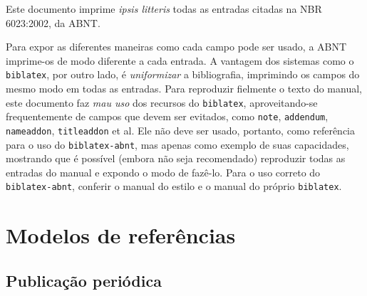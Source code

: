 \documentclass[a4paper]{article}
\title{NBR 6023:2002 - \iftoggle{reference}{Referência}{Teste}}
\author{Daniel Ballester Marques}
\let\origsection\section
\renewcommand\section{\clearpage\origsection}
\begin{document}
\maketitle

Este documento imprime \textit{ipsis litteris} todas as entradas citadas na
NBR 6023:2002, da ABNT.

Para expor as diferentes maneiras como cada campo pode ser usado, a ABNT
imprime-os de modo diferente a cada entrada. A vantagem dos sistemas como
o \texttt{biblatex}, por outro lado, é \emph{uniformizar} a bibliografia,
imprimindo os campos do mesmo modo em todas as entradas. Para reproduzir
fielmente o texto do manual, este documento faz \emph{mau uso} dos recursos do
\texttt{biblatex}, aproveitando-se frequentemente de campos que devem ser
evitados, como \texttt{note}, \texttt{addendum}, \texttt{nameaddon},
\texttt{titleaddon} et al. Ele não deve ser usado, portanto, como referência
para o uso do \texttt{biblatex-abnt}, mas apenas como exemplo de suas
capacidades, mostrando que é possível (embora não seja recomendado) reproduzir
todas as entradas do manual e expondo o modo de fazê-lo. Para o uso correto do
\texttt{biblatex-abnt}, conferir o manual do estilo e o manual do próprio
\texttt{biblatex}.

\tableofcontents

\nocite{*}


\setcounter{section}{6}

\section{Modelos de referências}


	\printbibliography[keyword=7.1, title={Monografia no todo}]

	\printbibliography[keyword=7.2,
    title={Monografia no todo em meio eletrônico}]

	\printbibliography[keyword=7.3, title={Parte de monografia}]

	\printbibliography[keyword=7.4,
    title={Parte de monografia em meio eletrônico}]

	\subsection{Publicação periódica}

	  \printbibliography[heading=subbib, keyword=7.5.1,
      title={Publicação periódica como um todo}]
	  \printbibliography[heading=subbib, keyword=7.5.2,
      title={Partes de revista, boletim etc.}]
	  \printbibliography[heading=subbib, keyword=7.5.3,
      title={Artigo e/ou matéria de revista, boletim etc.}]
	  \printbibliography[heading=subbib, keyword=7.5.4,
      title={Artigo e/ou matéria de revista,
             boletim etc.\ em meio eletrônico}]
	  \printbibliography[heading=subbib, keyword=7.5.5,
      title={Artigo e/ou matéria de jornal}]
\end{document}
